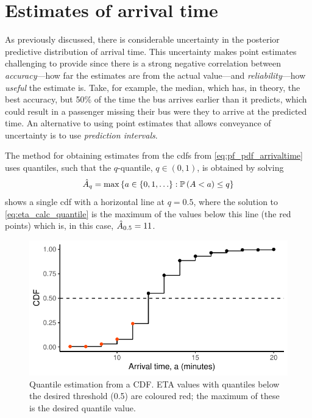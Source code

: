 \section{Estimates of arrival time}
\label{sec:eta_estimates}

As previously discussed, there is considerable uncertainty in the posterior predictive distribution of arrival time. This uncertainty makes point estimates challenging to provide since there is a strong negative correlation between \emph{accuracy}---how far the estimates are from the actual value---and \emph{reliability}---how \emph{useful} the estimate is. Take, for example, the median, which has, in theory, the best accuracy, but 50\% of the time the bus arrives earlier than it predicts, which could result in a passenger missing their bus were they to arrive at the predicted time. An alternative to using point estimates that allows conveyance of uncertainty is to use \emph{prediction intervals}.

The method for obtaining estimates from the \glspl{cdf} from \cref{eq:pf_pdf_arrivaltime} uses quantiles, such that the $q$-quantile, $q\in(0,1)$, is obtained by solving
\begin{equation}
\label{eq:eta_calc_quantile}
\hat{A}_q = \max\left\{a \in \{0, 1, \ldots\} : \mathbb{P}\left(A < a\right) \leq q\right\}
\end{equation}
 shows a single \gls{cdf} with a horizontal line at $q = 0.5$, where the solution to \cref{eq:eta_calc_quantile} is the maximum of the values below this line (the red points) which is, in this case, $\hat{A}_{0.5} = 11$.


\begin{knitrout}\small
{}\color{fgcolor}\begin{figure}

{\centering \includegraphics[width=.6\textwidth]{figure/eta_calc_quantile-1} 

}

\caption[Quantile estimation from a CDF]{Quantile estimation from a CDF. ETA values with quantiles below the desired threshold (0.5) are coloured red; the maximum of these is the desired quantile value.}\label{fig:eta_calc_quantile}
\end{figure}


\end{knitrout}




